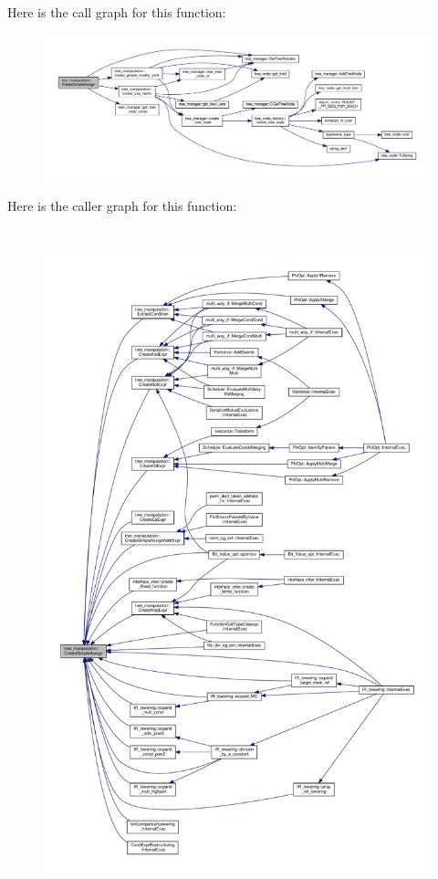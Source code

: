 Here is the call graph for this function\+:
\nopagebreak
\begin{figure}[H]
\begin{center}
\leavevmode
\includegraphics[width=350pt]{d0/d99/classtree__manipulation_a9deca96335915e77e0e829a75ac9c13f_cgraph}
\end{center}
\end{figure}
Here is the caller graph for this function\+:
\nopagebreak
\begin{figure}[H]
\begin{center}
\leavevmode
\includegraphics[height=550pt]{d0/d99/classtree__manipulation_a9deca96335915e77e0e829a75ac9c13f_icgraph}
\end{center}
\end{figure}
\mbox{\label{classtree__manipulation_af68e5e8accdf6b7d8b8b6dc2f5c91fb0}} 
